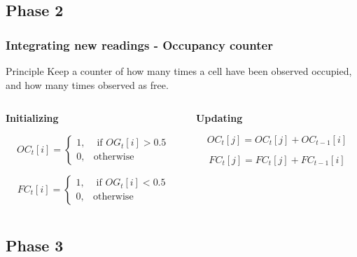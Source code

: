 \documentclass{beamer}
\begin{document}
\subsection{Phase 2}

	\begin{frame}
		\frametitle{Integrating new readings - Occupancy counter}		
		\begin{block}{Principle}
			Keep a counter of how many times a cell have been observed occupied, and how many times observed as free.
		\end{block}		
		
		  \begin{columns}[t]
		  \begin{column}{5cm}
		  \textbf{Initializing}
		  
		    \begin{equation}
			OC_t[i] =  \begin{cases} 1, & \mbox{ if $OG_t[i] > 0.5$} \\
			                       0, & \mbox{otherwise} \end{cases}
			\end{equation}

			\begin{equation}
			FC_t[i] = \begin{cases} 1, & \mbox{ if $OG_t[i] < 0.5$} \\
			                       0, & \mbox{otherwise} \end{cases}
			\end{equation}		  
		  
		  \end{column}
		  
		  \begin{column}{5cm}
		  \textbf{Updating}

			\begin{equation}
			OC_t[j] = OC_t[j] + OC_{t-1}[i]
			\end{equation}		  

			\begin{equation}
			FC_t[j] = FC_t[j] + FC_{t-1}[i]
			\end{equation}
		  
		  \end{column}
		 \end{columns}		 		
		
	\end{frame}

\subsection{Phase 3}
\end{document}
